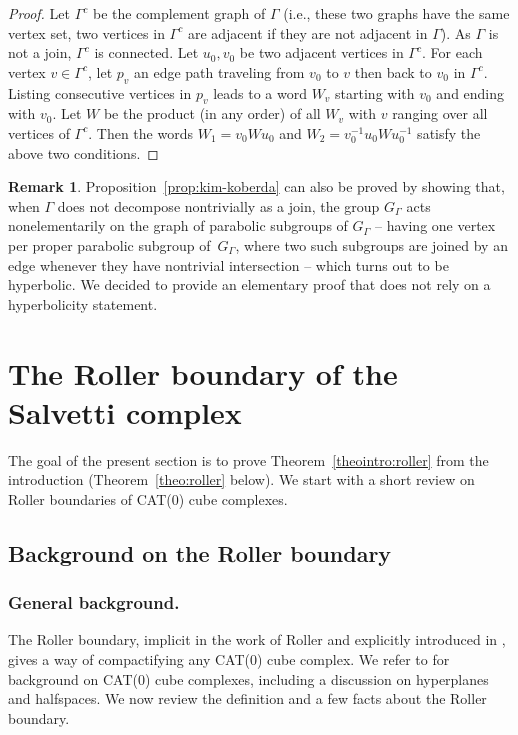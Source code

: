 \documentclass[11pt]{article}
\newcommand{\ie}{i.e.,\xspace}
\newcommand{\Subsection}{\subsection}
\numberwithin{equation}{section}
\theoremstyle{plain}
\theoremstyle{definition}
\newtheorem{rk}[theo]{Remark}
\begin{document}
\begin{proof}
Let $\Gamma^c$ be the complement graph of $\Gamma$ (\ie these two graphs have the same vertex set, two vertices in $\Gamma^c$ are adjacent if they are not adjacent in $\Gamma$). As $\Gamma$ is not a join, $\Gamma^c$ is connected. Let $u_0,v_0$ be two adjacent vertices in $\Gamma^c$. For each vertex $v\in \Gamma^c$, let $p_v$ an edge path traveling from $v_0$ to $v$ then back to $v_0$ in $\Gamma^c$. Listing consecutive vertices in $p_v$ leads to a word $W_v$ starting with $v_0$ and ending with $v_0$. Let $W$ be the product (in any order) of all $W_v$ with $v$ ranging over all vertices of $\Gamma^c$. Then the words $W_1=v_0Wu_0$ and $W_2=v^{-1}_0u_0Wu^{-1}_0$ satisfy the above two conditions.
\end{proof}

\begin{rk}
Proposition~\ref{prop:kim-koberda} can also be proved by showing that, when $\Gamma$ does not decompose nontrivially as a join, the group $G_\Gamma$ acts nonelementarily on the graph of parabolic subgroups of $G_\Gamma$ -- having one vertex per proper parabolic subgroup of~$G_\Gamma$, where two such subgroups are joined by an edge whenever they have nontrivial intersection -- which turns out to be hyperbolic. We decided to provide an elementary proof that does not rely on a hyperbolicity statement.
\end{rk}

\section{The Roller boundary of the Salvetti complex}

The goal of the present section is to prove Theorem~\ref{theointro:roller} from the introduction (Theorem~\ref{theo:roller} below). We start with a short review on Roller boundaries of CAT(0) cube complexes.

\Subsection{Background on the Roller boundary}\label{sec:background-roller}

\subsubsection*{General background.} The Roller boundary, implicit in the work of Roller \cite{Rol} and explicitly introduced in \cite{BCGNW}, gives a way of compactifying any CAT(0) cube complex. We refer to \cite{sageev2012cat} for background on CAT(0) cube complexes, including a discussion on hyperplanes and halfspaces. We now review the definition and a few facts about the Roller boundary.
\end{document}
